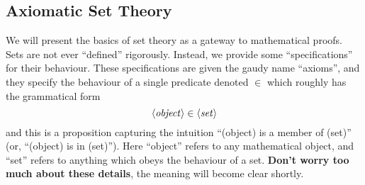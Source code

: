 \subsection{Axiomatic Set Theory}
We will present the basics of set theory as a gateway to mathematical
proofs. Sets are not ever ``defined'' rigorously. Instead, we provide
some ``specifications'' for their behaviour. These specifications are
given the gaudy name ``axioms'', and they specify the behaviour of a
single predicate denoted $\in$ which roughly has the grammatical form
\begin{equation}
\langle\mbox{\textit{object}}\rangle\in\langle\mbox{\textit{set}}\rangle
\end{equation}
and this is a proposition capturing the intuition ``(object) is a member
of (set)'' (or, ``(object) is in (set)''). Here ``object'' refers to any
mathematical object, and ``set'' refers to anything which obeys the
behaviour of a set. \textbf{Don't worry too much about these details},
the meaning will become clear shortly.

